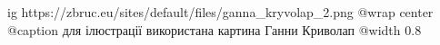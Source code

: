  
 
 
 
 

\ifcmt
  ig https://zbruc.eu/sites/default/files/ganna_kryvolap_2.png
  @wrap center
	@caption для ілюстрації використана картина Ганни Криволап
  @width 0.8
\fi
